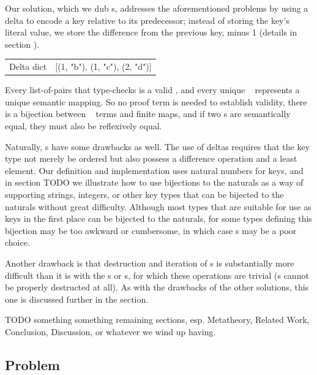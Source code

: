 Our solution, which we dub {\dd}s, addresses the aforementioned problems by using a delta to
encode a key relative to its predecessor; instead of storing the key's literal value, we store the difference
from the previous key, minus 1 (details in section ).
\\
\begin{tabular}{ l l }
 \quad\quad Delta dict & [(1, "b"), (1, "c"), (2, "d")]
\end{tabular}

Every list-of-pairs that type-checks is a valid \dd, and every unique \dd~ represents
a unique semantic mapping. So no proof term is needed to establish validity, there is a bijection between
\dd~ terms and finite maps, and if two {\dd}s are semantically equal, they must also be reflexively equal.

Naturally, {\dd}s have some drawbacks as well. The use of deltas requires that the key type not merely be
ordered but also possess a difference operation and a least element. Our definition and implementation uses
natural numbers for keys, and in section TODO we illustrate how to use bijections to the naturals as a way
of supporting strings, integers, or other key types that can be bijected to the naturals without great
difficulty. Although most types that are suitable for use as keys in the first place can be bijected to the
naturals, for some types defining this bijection may be too awkward or cumbersome, in which case {\dd}s may
be a poor choice.

Another drawback is that destruction and iteration of {\dd}s is substantially more
difficult than it is with the {\SAL}s or {\CAL}s, for which these operations are trivial
({\FPF}s cannot be properly destructed at all). As with the drawbacks of the other solutions, this one is
discussed further in the  section.

TODO something something remaining sections, esp. Metatheory, Related Work, Conclusion, Discussion, or
whatever we wind up having.


\subsection{Problem}
\label{sec:Problem}


